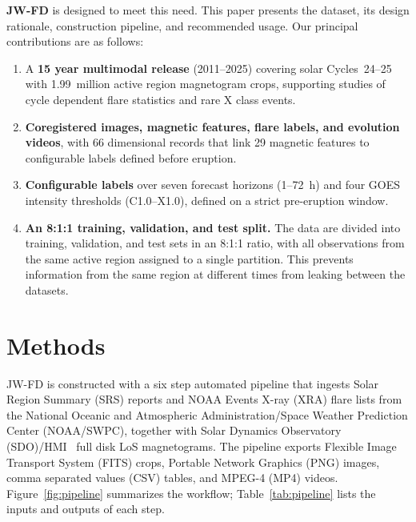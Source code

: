 \documentclass[universe,article,submit,moreauthors]{Definitions/mdpi}
\newif\ifrevision
\newcommand{\add}[1]{\ifrevision\textcolor{blue}{#1}\else#1\fi}
\newcommand{\del}[1]{\ifrevision\textcolor{red}{\sout{#1}}\else\fi}
\begin{document}
\textbf{JW-FD} is designed to meet this need. This paper presents the dataset, its design rationale, construction pipeline, and recommended usage.
Our principal contributions are as follows:
\begin{enumerate}
\item A \textbf{15 year multimodal release} (2011--2025) covering solar Cycles~24--25 with 1.99~million active region magnetogram crops, supporting studies of cycle dependent flare statistics and rare X class events.
\item \textbf{Coregistered images, magnetic features, flare labels, and evolution videos}, with 66 dimensional records that link 29 magnetic features to configurable labels defined before eruption.
\item \textbf{Configurable labels} over seven forecast horizons (1--72~h) and four GOES intensity thresholds (C1.0--X1.0), defined on a strict pre-eruption window.
\item \textbf{An 8:1:1 training, validation, and test split.} The data are divided into training, validation, and test sets in an 8:1:1 ratio, with all observations from the same active region assigned to a single partition. This prevents information from the same region at different times from leaking between the datasets. \del{After the seed-62 random allocation, 19 active regions were reassigned so that rare M- and X-class positives are balanced between validation and test at all seven forecast horizons.}
\end{enumerate}

\section{Methods}
\label{sec:methods}

JW-FD is constructed with a six step automated pipeline that ingests Solar Region Summary (SRS) reports and NOAA Events X-ray (XRA) flare lists from the National Oceanic and Atmospheric Administration/Space Weather Prediction Center (NOAA/SWPC), together with Solar Dynamics Observatory (SDO)/HMI~\cite{Scherrer2012,Pesnell2012} full disk LoS magnetograms. The pipeline exports Flexible Image Transport System (FITS) crops, Portable Network Graphics (PNG) images, comma separated values (CSV) tables, and MPEG-4 (MP4) videos. Figure~\ref{fig:pipeline} summarizes the workflow; Table~\ref{tab:pipeline} lists the inputs and outputs of each step.
\end{document}
